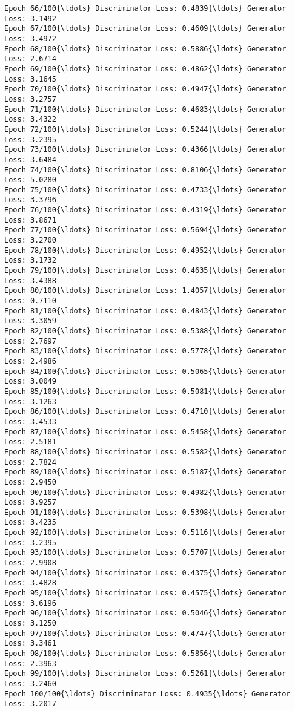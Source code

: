 \documentclass[11pt]{article}
\begin{document}
\begin{Verbatim}[commandchars=\\\{\}]
Epoch 66/100{\ldots} Discriminator Loss: 0.4839{\ldots} Generator Loss: 3.1492
Epoch 67/100{\ldots} Discriminator Loss: 0.4609{\ldots} Generator Loss: 3.4972
Epoch 68/100{\ldots} Discriminator Loss: 0.5886{\ldots} Generator Loss: 2.6714
Epoch 69/100{\ldots} Discriminator Loss: 0.4862{\ldots} Generator Loss: 3.1645
Epoch 70/100{\ldots} Discriminator Loss: 0.4947{\ldots} Generator Loss: 3.2757
Epoch 71/100{\ldots} Discriminator Loss: 0.4683{\ldots} Generator Loss: 3.4322
Epoch 72/100{\ldots} Discriminator Loss: 0.5244{\ldots} Generator Loss: 3.2395
Epoch 73/100{\ldots} Discriminator Loss: 0.4366{\ldots} Generator Loss: 3.6484
Epoch 74/100{\ldots} Discriminator Loss: 0.8106{\ldots} Generator Loss: 5.0280
Epoch 75/100{\ldots} Discriminator Loss: 0.4733{\ldots} Generator Loss: 3.3796
Epoch 76/100{\ldots} Discriminator Loss: 0.4319{\ldots} Generator Loss: 3.8671
Epoch 77/100{\ldots} Discriminator Loss: 0.5694{\ldots} Generator Loss: 3.2700
Epoch 78/100{\ldots} Discriminator Loss: 0.4952{\ldots} Generator Loss: 3.1732
Epoch 79/100{\ldots} Discriminator Loss: 0.4635{\ldots} Generator Loss: 3.4388
Epoch 80/100{\ldots} Discriminator Loss: 1.4057{\ldots} Generator Loss: 0.7110
Epoch 81/100{\ldots} Discriminator Loss: 0.4843{\ldots} Generator Loss: 3.3059
Epoch 82/100{\ldots} Discriminator Loss: 0.5388{\ldots} Generator Loss: 2.7697
Epoch 83/100{\ldots} Discriminator Loss: 0.5778{\ldots} Generator Loss: 2.4986
Epoch 84/100{\ldots} Discriminator Loss: 0.5065{\ldots} Generator Loss: 3.0049
Epoch 85/100{\ldots} Discriminator Loss: 0.5081{\ldots} Generator Loss: 3.1263
Epoch 86/100{\ldots} Discriminator Loss: 0.4710{\ldots} Generator Loss: 3.4533
Epoch 87/100{\ldots} Discriminator Loss: 0.5458{\ldots} Generator Loss: 2.5181
Epoch 88/100{\ldots} Discriminator Loss: 0.5582{\ldots} Generator Loss: 2.7824
Epoch 89/100{\ldots} Discriminator Loss: 0.5187{\ldots} Generator Loss: 2.9450
Epoch 90/100{\ldots} Discriminator Loss: 0.4982{\ldots} Generator Loss: 3.9257
Epoch 91/100{\ldots} Discriminator Loss: 0.5398{\ldots} Generator Loss: 3.4235
Epoch 92/100{\ldots} Discriminator Loss: 0.5116{\ldots} Generator Loss: 3.2395
Epoch 93/100{\ldots} Discriminator Loss: 0.5707{\ldots} Generator Loss: 2.9908
Epoch 94/100{\ldots} Discriminator Loss: 0.4375{\ldots} Generator Loss: 3.4828
Epoch 95/100{\ldots} Discriminator Loss: 0.4575{\ldots} Generator Loss: 3.6196
Epoch 96/100{\ldots} Discriminator Loss: 0.5046{\ldots} Generator Loss: 3.1250
Epoch 97/100{\ldots} Discriminator Loss: 0.4747{\ldots} Generator Loss: 3.3461
Epoch 98/100{\ldots} Discriminator Loss: 0.5856{\ldots} Generator Loss: 2.3963
Epoch 99/100{\ldots} Discriminator Loss: 0.5261{\ldots} Generator Loss: 3.2460
Epoch 100/100{\ldots} Discriminator Loss: 0.4935{\ldots} Generator Loss: 3.2017

    \end{Verbatim}
\end{document}
